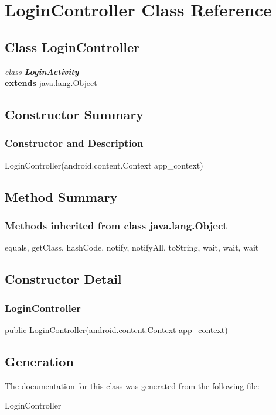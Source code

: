 \hypertarget{class_LoginController.Android}{\section{LoginController Class Reference}
\label{class_LoginController.Android}
}

\subsection*{Class LoginController}

\textit{class \textbf{LoginActivity}}\\
\tab \textbf{extends} java.lang.Object\\





\subsection{Constructor Summary}

\subsubsection{Constructor and Description}

LoginController(android.content.Context app\_context)\\



\subsection{Method Summary}

\subsubsection{Methods inherited from class java.lang.Object}

equals, getClass, hashCode, notify, notifyAll, toString, wait, wait, wait


\subsection{Constructor Detail}

\subsubsection{LoginController}

public LoginController(android.content.Context app_context)\\


\subsection{Generation}
The documentation for this class was generated from the following file\-:
\begin{DoxyCompactItemize}
\item LoginController
\end{DoxyCompactItemize} 









